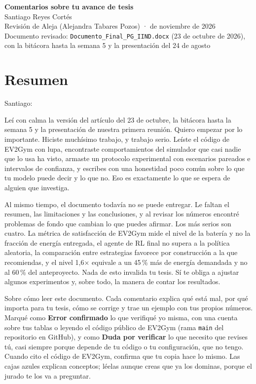 \documentclass[11pt]{article}
\newcommand{\estudiante}{Santiago Reyes Cortés}
\newcommand{\fecharevision}{1 de noviembre de 2026}
\newcommand{\confirmado}{\colorbox{rojoerror!15}{\small\bfseries\color{rojoerror} Error confirmado}}
\newcommand{\pordudar}{\colorbox{black!10}{\small\bfseries\color{black!75} Duda por verificar}}
\begin{document}
\begin{center}
  {\LARGE\bfseries\color{andesazul} Comentarios sobre tu avance de tesis}\\[6pt]
  {\large \estudiante}\\[2pt]
  {\small Revisión de Aleja (Alejandra Tabares Pozos) \quad·\quad \fecharevision}\\[2pt]
  {\small Documento revisado: \texttt{Documento\_Final\_PG\_IIND.docx} (23 de octubre de 2026), con la bitácora hasta la semana 5 y la presentación del 24 de agosto}
\end{center}

\section*{Resumen}

Santiago:

Leí con calma la versión del artículo del 23 de octubre, la bitácora hasta la semana 5 y la presentación de nuestra primera reunión. Quiero empezar por lo importante. Hiciste muchísimo trabajo, y trabajo serio. Leíste el código de EV2Gym con lupa, encontraste comportamientos del simulador que casi nadie que lo usa ha visto, armaste un protocolo experimental con escenarios pareados e intervalos de confianza, y escribes con una honestidad poco común sobre lo que tu modelo puede decir y lo que no. Eso es exactamente lo que se espera de alguien que investiga.

Al mismo tiempo, el documento todavía no se puede entregar. Le faltan el resumen, las limitaciones y las conclusiones, y al revisar los números encontré problemas de fondo que cambian lo que puedes afirmar. Los más serios son cuatro. La métrica de satisfacción de EV2Gym mide el nivel de la batería y no la fracción de energía entregada, el agente de RL final no supera a la política aleatoria, la comparación entre estrategias favorece por construcción a la que recomiendas, y el nivel 1,6× equivale a un 45\,\% más de energía demandada y no al 60\,\% del anteproyecto. Nada de esto invalida tu tesis. Sí te obliga a ajustar algunos experimentos y, sobre todo, la manera de contar los resultados.

Sobre cómo leer este documento. Cada comentario explica qué está mal, por qué importa para tu tesis, cómo se corrige y trae un ejemplo con tus propios números. Marqué como \confirmado{} lo que verifiqué yo misma, con una cuenta sobre tus tablas o leyendo el código público de EV2Gym (rama \texttt{main} del repositorio en GitHub), y como \pordudar{} lo que necesito que revises tú, casi siempre porque depende de tu código o tu configuración, que no tengo. Cuando cito el código de EV2Gym, confirma que tu copia hace lo mismo. Las cajas azules explican conceptos; léelas aunque creas que ya los dominas, porque el jurado te los va a preguntar.
\end{document}
